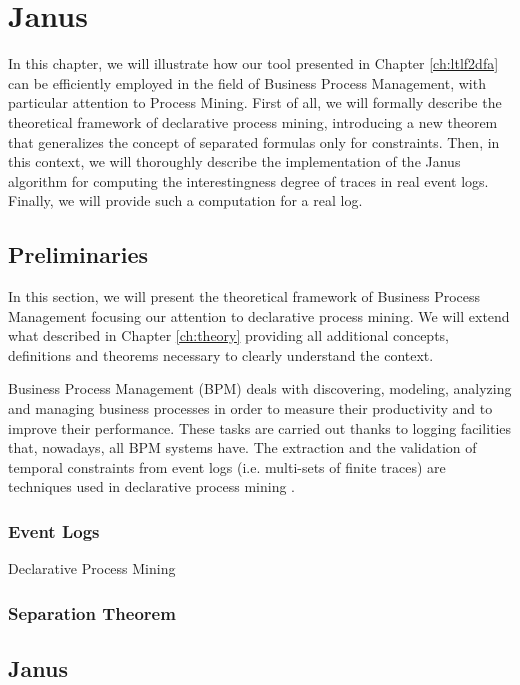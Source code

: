 \chapter{Janus}
In this chapter, we will illustrate how our tool \LTLfToDFA presented in Chapter \ref{ch:ltlf2dfa} can be efficiently employed in the field of Business Process Management, with particular attention to Process Mining. First of all, we will formally describe the theoretical framework of declarative process mining, introducing a new theorem that generalizes the concept of separated formulas only for \declare constraints. Then, in this context, we will thoroughly describe the implementation of the Janus algorithm \citep{cecconi2018interestingness} for computing the interestingness degree of traces in real event logs. Finally, we will provide such a computation for a real log. 
\section{Preliminaries}
In this section, we will present the theoretical framework of Business Process Management focusing our attention to declarative process mining. We will extend what described in Chapter \ref{ch:theory} providing all additional concepts, definitions and theorems necessary to clearly understand the context.

Business Process Management (BPM) deals with discovering, modeling, analyzing and managing business processes in order to measure their productivity and to improve their performance. These tasks are carried out thanks to logging facilities that, nowadays, all BPM systems have. The extraction and the validation of temporal constraints from event logs (i.e. multi-sets of finite traces) are techniques used in declarative process mining \citep{montali2010declarative}.
\subsection{Event Logs}
Declarative Process Mining
\subsection{\declare}
\subsection{Separation Theorem}
\section{Janus}
